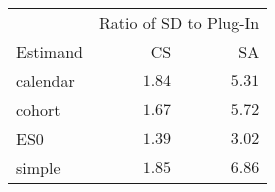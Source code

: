 \captionsetup[table]{labelformat=empty,skip=1pt}
\begin{longtable}{lrr}
\toprule
 & \multicolumn{2}{c}{Ratio of SD to Plug-In} \\ 
 \cmidrule(lr){2-3}
Estimand & CS & SA \\ 
\midrule
calendar & $1.84$ & $5.31$ \\ 
cohort & $1.67$ & $5.72$ \\ 
ES0 & $1.39$ & $3.02$ \\ 
simple & $1.85$ & $6.86$ \\ 
 \bottomrule
\end{longtable}

